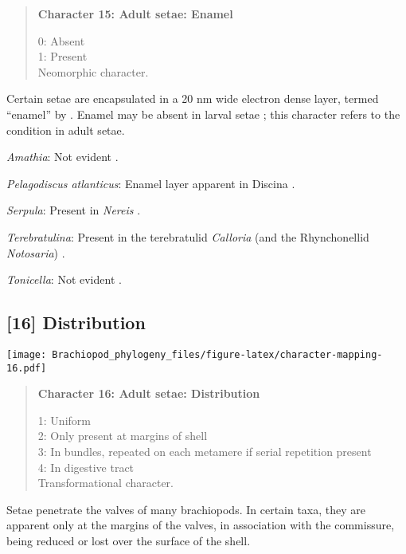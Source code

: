 \documentclass[openany]{book}
\theoremstyle{definition}
\theoremstyle{definition}
\theoremstyle{definition}
\theoremstyle{remark}
\begin{document}
\begin{quote}
\textbf{Character 15: Adult setae: Enamel}

0: Absent\\
1: Present\\
Neomorphic character.
\end{quote}

Certain setae are encapsulated in a 20 nm wide electron dense layer,
termed ``enamel'' by \citet{Gustus1973}. Enamel may be absent in larval
setae \citep{Luter2003}; this character refers to the condition in adult
setae.

\hypertarget{Amathia-coding-15}{}
\emph{Amathia}: Not evident \citep{Gordon1975}.

\hypertarget{Pelagodiscus_atlanticus-coding-15}{}
\emph{Pelagodiscus atlanticus}: Enamel layer apparent in Discina
\citep[fig. 47.1]{Williams1997Introduction}.

\hypertarget{Serpula-coding-15}{}
\emph{Serpula}: Present in \emph{Nereis} \citep{Gustus1973}.

\hypertarget{Terebratulina-coding-15}{}
\emph{Terebratulina}: Present in the terebratulid \emph{Calloria} (and
the Rhynchonellid \emph{Notosaria}) \citep{Luter2000}.

\hypertarget{Tonicella-coding-15}{}
\emph{Tonicella}: Not evident \citep{Leise1988, Fischer1980}.

\subsection*{{[}16{]} Distribution}\label{distribution}

\texttt{[image: Brachiopod\_phylogeny\_files/figure-latex/character-mapping-16.pdf]}

\begin{quote}
\textbf{Character 16: Adult setae: Distribution}

1: Uniform\\
2: Only present at margins of shell\\
3: In bundles, repeated on each metamere if serial repetition present\\
4: In digestive tract\\
Transformational character.
\end{quote}

Setae penetrate the valves of many brachiopods. In certain taxa, they
are apparent only at the margins of the valves, in association with the
commissure, being reduced or lost over the surface of the shell.
\end{document}
